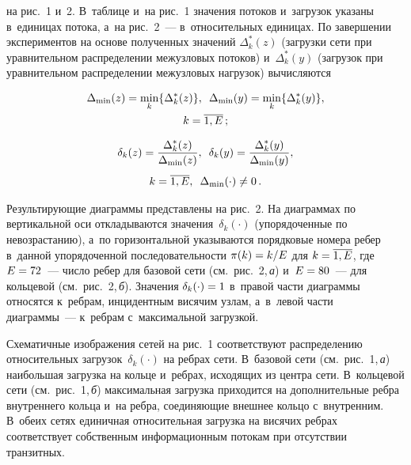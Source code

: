\begin{multicols}{2}


\noindent
 на рис.~1 и~2. В~таб\-ли\-це и~на рис.~1 значения потоков и~за\-гру\-зок 
указаны в~единицах потока, а~на рис.~2~--- в~относительных единицах. По 
завершении экспериментов на осно\-ве полученных значений $\Delta_k^*(z)$ 
(за\-груз\-ки сети при урав\-ни\-тель\-ном рас\-пре\-де\-ле\-нии межузловых потоков) 
и~$\Delta_k^*(y)$ (загрузок при урав\-ни\-тель\-ном распределении межузловых на\-гру\-зок) вы\-чис\-ля\-ют\-ся

 \vspace*{-4pt}
 
 \noindent
\begin{multline*}
\Delta_{\min}(z) = \min_k\{\Delta_k^*(z)\}, \enskip
 \Delta_{\min}(y) =  \min_k\{\Delta_k^*(y)\},\\
    k= \overline{1, E}\,;
\end{multline*}

\vspace*{-15pt}

\columnbreak

\noindent
\begin{multline*}
\delta_k(z) = \displaystyle\frac{\displaystyle \Delta_k^*(z)\mathstrut}{\displaystyle \Delta_{\min}(z)\mathstrut}, \enskip
 \delta_k(y) = \displaystyle\frac{\displaystyle \Delta_k^*(y)\mathstrut}{\displaystyle \Delta_{\min}(y)\mathstrut}, \\[4pt]
  k= \overline{1, E},\enskip \Delta_{\min}(\cdot) \not = 0\,.
\end{multline*}


 


Результирующие диаграммы пред\-став\-ле\-ны на рис.~2. На диаграммах по 
вертикальной оси откладываются значения~$\delta_k(\cdot)$ (упорядоченные по
не\-воз\-рас\-та\-нию), а~по горизонтальной ука\-зы\-ва\-ют\-ся порядковые номера ре\-бер в~данной 
упорядоченной по\-сле\-до\-ва\-тель\-ности $\pi(k) \hm= k/E$  для $k \hm= \overline{1, E}$, где $E \hm= 
72$~--- чис\-ло ребер для базовой сети (см.\ рис.~2,\,\textit{а}) и~$E \hm= 80$~--- для кольцевой (см.\ рис.~2,\,\textit{б}). 
Значения $\delta_k(\cdot) \hm= 1$ в~правой час\-ти диаграммы относятся к~реб\-рам, 
инцидентным висячим узлам, а~в~левой час\-ти диаграммы~--- к~реб\-рам с~максимальной за\-груз\-кой.
{

}

Схематичные изображения сетей на рис.~1 соответствуют рас\-пре\-де\-ле\-нию 
относительных за\-гру\-зок~$\delta_k(\cdot)$ на реб\-рах сети. В~базовой сети (см.\ рис.~1,\,\textit{а}) 
наибольшая за\-груз\-ка на коль\-це и~реб\-рах, исходящих из цент\-ра сети. В~кольцевой 
сети (см.\ рис.~1,\,\textit{б}) максимальная за\-груз\-ка приходится на дополнительные реб\-ра 
внут\-рен\-не\-го коль\-ца и~на реб\-ра, со\-еди\-ня\-ющие внеш\-нее кольцо с~внут\-рен\-ним. В~обеих 
сетях единичная относительная за\-груз\-ка на висячих реб\-рах соответствует 
собственным информационным потокам при отсутствии тран\-зит\-ных.
{

}
\end{multicols}
